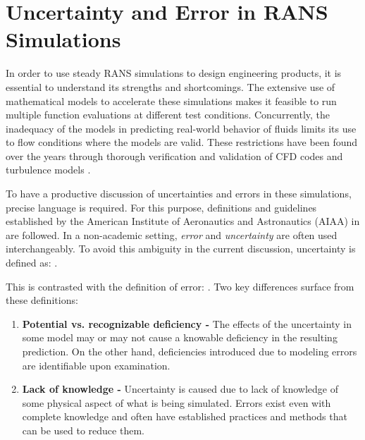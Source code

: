 \section{Uncertainty and Error in RANS Simulations}

In order to use steady RANS simulations to design engineering products, it is essential to understand its strengths and shortcomings. The extensive use of mathematical models to accelerate these simulations makes it feasible to run multiple function evaluations at different test conditions. Concurrently, the inadequacy of the models in predicting real-world behavior of fluids limits its use to flow conditions where the models are valid. These restrictions have been found over the years through thorough verification and validation of CFD codes and turbulence models \cite{oberkampf_verication_2002}. 

To have a productive discussion of uncertainties and errors in these simulations, precise language is required. For this purpose, definitions and guidelines established by the American Institute of Aeronautics and Astronautics (AIAA) in \cite{computational_fluid_dynamics_committee_guide_1998} are followed. In a non-academic setting, \textit{error} and \textit{uncertainty} are often used interchangeably. To avoid this ambiguity in the current discussion, uncertainty is defined as: 
 \cite{computational_fluid_dynamics_committee_guide_1998}. 

This is contrasted with the definition of error: 
 \cite{computational_fluid_dynamics_committee_guide_1998}. Two key differences surface from these definitions: 

\begin{enumerate}
    \item \textbf{Potential vs. recognizable deficiency -} The effects of the uncertainty in some model may or may not cause a knowable deficiency in the resulting prediction. On the other hand, deficiencies introduced due to modeling errors are identifiable upon examination. 
    
    \item \textbf{Lack of knowledge -} Uncertainty is caused due to lack of knowledge of some physical aspect of what is being simulated. Errors exist even with complete knowledge and often have established practices and methods that can be used to reduce them.  
\end{enumerate}

